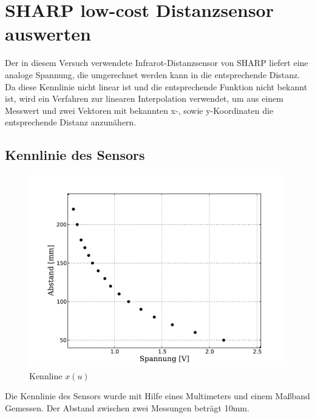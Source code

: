 \documentclass[a4paper]{report}
\begin{document}
\chapter{SHARP low-cost Distanzsensor auswerten}
Der in diesem Versuch verwendete Infrarot-Distanzsensor von SHARP liefert eine analoge Spannung, die umgerechnet werden kann in die entsprechende Distanz. Da diese Kennlinie nicht linear ist und die entsprechende Funktion nicht bekannt ist, wird ein Verfahren zur linearen Interpolation verwendet, um aus einem Messwert und zwei Vektoren mit bekannten x-, sowie y-Koordinaten die entsprechende Distanz anzun\"ahern.

\section{Kennlinie des Sensors}
\begin{figure}[H]
\includegraphics[width=\textwidth]{img/kennlinie.pdf}
\caption{Kennline $x(u)$}
\end{figure}
Die Kennlinie des Sensors wurde mit Hilfe eines Multimeters und einem Maßband Gemessen. Der Abstand zwischen zwei Messungen betr\"agt 10mm.
\end{document}
